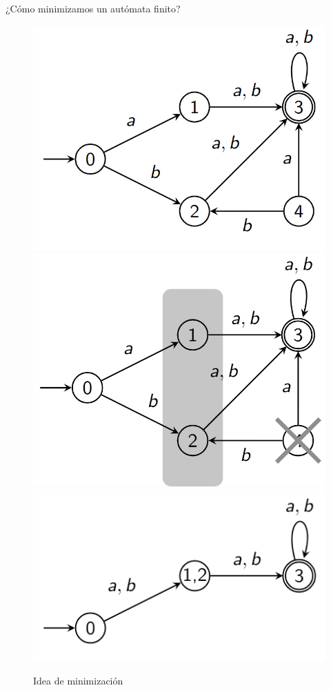 ¿Cómo minimizamos un autómata finito?
\begin{figure}[H]
    \centering
    \includegraphics[scale=0.4]{img/cap2/min.png}
    \includegraphics[scale=0.1755]{img/cap2/min_2.png}
    \includegraphics[scale=0.35]{img/cap2/min_3.png}
    \caption{Idea de minimización}
\end{figure}

